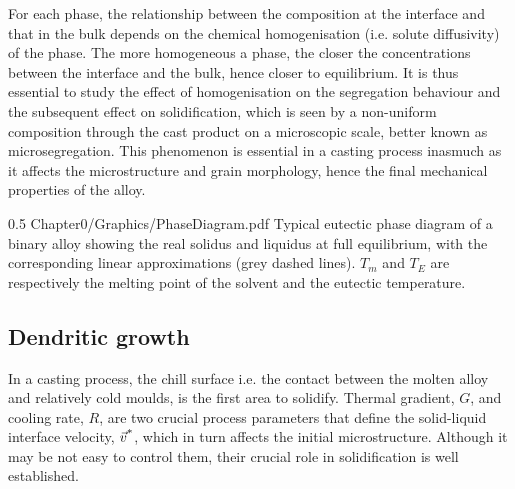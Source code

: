 For each phase, the relationship between the composition at the interface and that in the bulk depends on the chemical homogenisation (i.e. solute diffusivity) of the phase.
The more homogeneous a phase, the closer the concentrations between the interface and the bulk, hence closer to equilibrium.
It is thus essential to study the effect of homogenisation on the segregation behaviour and the subsequent effect on solidification, 
which is seen by a non-uniform composition through the cast product on a microscopic scale, better known as microsegregation.
This phenomenon is essential in a casting process inasmuch as it affects the microstructure and grain morphology, hence the final
mechanical properties of the alloy.
\begin{figureth}
{0.5}
{Chapter0/Graphics/PhaseDiagram.pdf}
{Typical eutectic phase diagram of a binary alloy showing the real solidus and liquidus at full equilibrium,
with the corresponding linear approximations (grey dashed lines). $T_m$ and $T_E$ are respectively the melting point
of the solvent and the eutectic temperature.}
\label{fig:binary_diag}
\end{figureth}
%
\subsection{Dendritic growth}
In a casting process, the chill surface i.e. the contact between the molten alloy and relatively cold moulds, is the first area to solidify. 
Thermal gradient, $G$, and cooling rate, $R$, are two crucial process parameters that define the solid-liquid interface velocity, $\vec{v}^\text{*}$, which in turn
affects the initial microstructure. Although it may be not easy to control them, their crucial role in solidification is well established.

